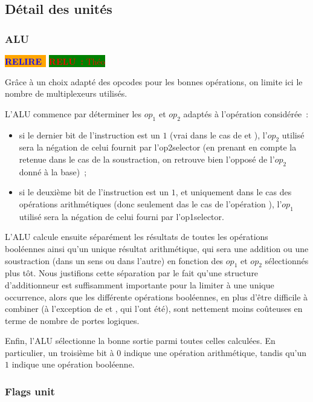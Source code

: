 \documentclass[11pt,a4paper]{article}
\newcommand{\relire}{\colorbox{orange}{\textcolor{blue}{\textbf{RELIRE}~}}}
\newcommand{\relu}[1]{\colorbox{green}{\textcolor{red}{\textbf{RELU~:} #1}}}
\begin{document}
\subsection{Détail des unités}

\subsubsection{ALU} \label{sssec:procunit_alu}

\relire
\relu{Théo}

Grâce à un choix adapté des opcodes pour les bonnes opérations, on limite ici le nombre de multiplexeurs utilisés.

L'ALU commence par déterminer les $op_1$ et $op_2$ adaptés à l'opération considérée~:
\begin{itemize}

\item si le dernier bit de l'instruction est un $1$ (vrai dans le cas de  et ), l'$op_2$ utilisé sera la négation de celui fournit par l'op2selector (en prenant en compte la retenue dans le cas de la soustraction, on retrouve bien l'opposé de l'$op_2$ donné à la base)~;

\item si le deuxième bit de l'instruction est un $1$, et uniquement dans le cas des opérations arithmétiques (donc seulement das le cas de l'opération ), l'$op_1$ utilisé sera la négation de celui fourni par l'op1selector.

\end{itemize}

L'ALU calcule ensuite séparément les résultats de toutes les opérations booléennes ainsi qu'un unique résultat arithmétique, qui sera une addition ou une soustraction (dans un sens ou dans l'autre) en fonction des $op_1$ et $op_2$ sélectionnés plus tôt. Nous justifions cette séparation par le fait qu'une structure d'additionneur est suffisamment importante pour la limiter à une unique occurrence, alors que les différente opérations booléennes, en plus d'être difficile à combiner (à l'exception de  et , qui l'ont été), sont nettement moins coûteuses en terme de nombre de portes logiques.

Enfin, l'ALU sélectionne la bonne sortie parmi toutes celles calculées. En particulier, un troisième bit à $0$ indique une opération arithmétique, tandis qu'un $1$ indique une opération booléenne.

\subsubsection{Flags unit}
\end{document}
